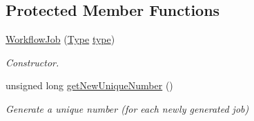 \subsection*{Protected Member Functions}
\begin{DoxyCompactItemize}
\item 
\hyperlink{classwrench_1_1_workflow_job_a2c1b2e3a711878bc7fcae1e12b55dd24}{Workflow\+Job} (\hyperlink{classwrench_1_1_workflow_job_a5dcf81c50b5d221ef2a48126bf45d08b}{Type} \hyperlink{classwrench_1_1_workflow_job_a03d2b65193a36b34e5451489b5b73737}{type})
\begin{DoxyCompactList}\small\item\em Constructor. \end{DoxyCompactList}\item 
unsigned long \hyperlink{classwrench_1_1_workflow_job_ae7aac4964471e2bac76be5c4ba1c119c}{get\+New\+Unique\+Number} ()
\begin{DoxyCompactList}\small\item\em Generate a unique number (for each newly generated job) \end{DoxyCompactList}\end{DoxyCompactItemize}
